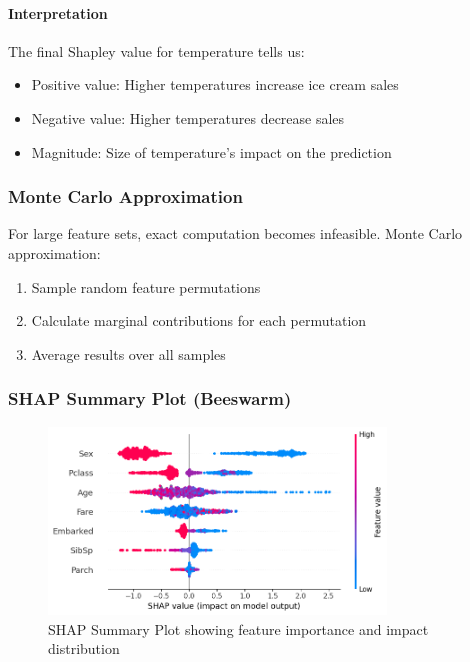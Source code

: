 \documentclass{article}
\begin{document}
\paragraph{Interpretation}
The final Shapley value for temperature tells us:
\begin{itemize}
    \item Positive value: Higher temperatures increase ice cream sales
    \item Negative value: Higher temperatures decrease sales
    \item Magnitude: Size of temperature's impact on the prediction
\end{itemize}

\subsubsection{Monte Carlo Approximation}
For large feature sets, exact computation becomes infeasible. Monte Carlo approximation:
\begin{enumerate}
    \item Sample random feature permutations
    \item Calculate marginal contributions for each permutation
    \item Average results over all samples
\end{enumerate}

\subsubsection{SHAP Summary Plot (Beeswarm)}
\begin{figure}[h]
    \centering
    \includegraphics[width=0.8\textwidth]{resources/images/bee_swarm.png}
    \caption{SHAP Summary Plot showing feature importance and impact distribution}
    \label{fig:shap_summary}
\end{figure}
\end{document}
